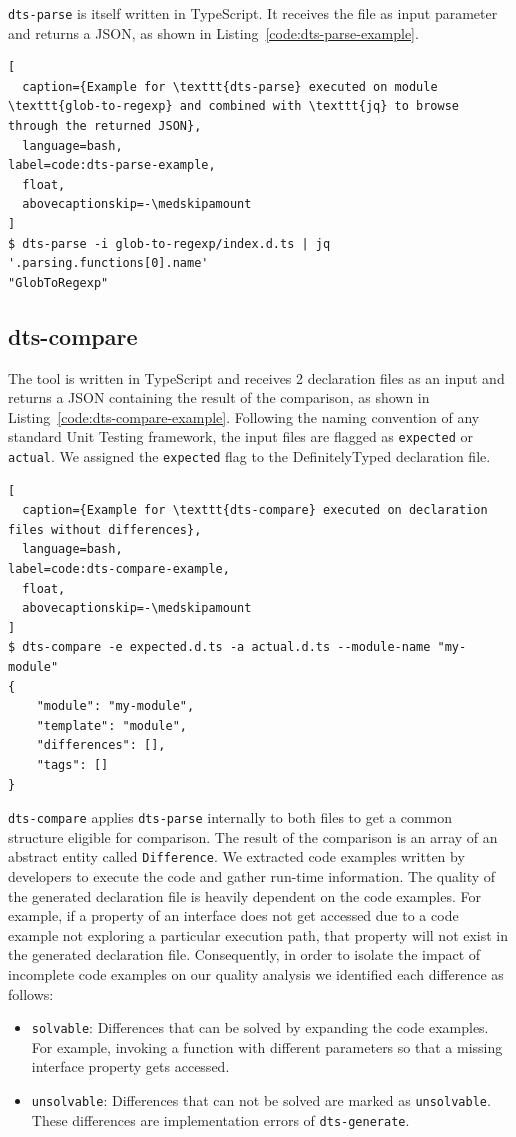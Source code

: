 \documentclass[english,cleveref,autoref,submission]{programming}
\newcommand{\coderef}[1]{Listing~\ref{#1}}
\begin{document}
\texttt{dts-parse} is itself written in TypeScript. It receives the file as input parameter and returns a JSON, as shown in \coderef{code:dts-parse-example}.

\begin{lstlisting}[
  caption={Example for \texttt{dts-parse} executed on module \texttt{glob-to-regexp} and combined with \texttt{jq} to browse through the returned JSON},
  language=bash,
label=code:dts-parse-example,
  float,
  abovecaptionskip=-\medskipamount
]
$ dts-parse -i glob-to-regexp/index.d.ts | jq '.parsing.functions[0].name'
"GlobToRegexp"
\end{lstlisting}

\subsection{dts-compare}
\label{sec:dts-compare}
The tool is written in TypeScript and receives 2 declaration files as an input and returns a JSON containing the result of the comparison, as shown in \coderef{code:dts-compare-example}. Following the naming convention of any standard Unit Testing framework, the input files are flagged as \lstinline{expected} or \lstinline{actual}. We assigned the \lstinline{expected} flag to the DefinitelyTyped declaration file.

\begin{lstlisting}[
  caption={Example for \texttt{dts-compare} executed on declaration files without differences},
  language=bash,
label=code:dts-compare-example,
  float,
  abovecaptionskip=-\medskipamount
]
$ dts-compare -e expected.d.ts -a actual.d.ts --module-name "my-module"
{
    "module": "my-module",
    "template": "module",
    "differences": [],
    "tags": []
}
\end{lstlisting}

\texttt{dts-compare} applies \texttt{dts-parse} internally to both files to get a common structure eligible for comparison. The result of the comparison is an array of an abstract entity called \texttt{Difference}. We extracted code examples written by developers to execute the code and gather run-time information. The quality of the generated declaration file is heavily dependent on the code examples. For example, if a property of an interface does not get accessed due to a code example not exploring a particular execution path, that property will not exist in the generated declaration file. Consequently, in order to isolate the impact of incomplete code examples on our quality analysis we identified each difference as follows:
\begin{itemize}
  \item \texttt{solvable}: Differences that can be solved by expanding the code examples. For example, invoking a function with different parameters so that a missing interface property gets accessed.
  \item \texttt{unsolvable}: Differences that can not be solved are marked as \texttt{unsolvable}. These differences are implementation errors of \texttt{dts-generate}.
\end{itemize}
\end{document}
